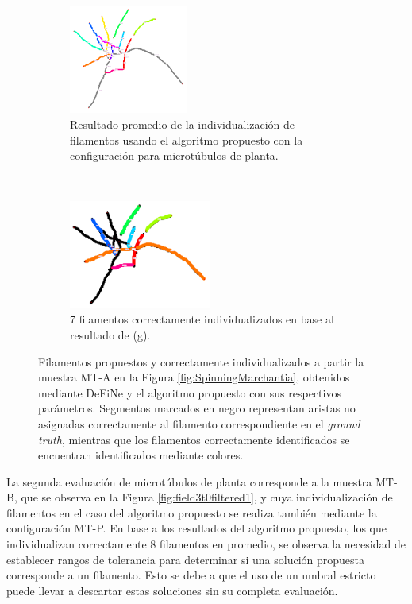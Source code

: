 \begin{figure}[h!]
    \begin{subfigure}[t]{0.49\textwidth}
        \centering
        \includegraphics[height=1.4in]{resultImages/50-ROIs-Spinning-Marchantia-phil-s10-v05-nobg-antLabeled.png}
        \caption{Resultado promedio de la individualizaci\'on de filamentos usando el algoritmo propuesto con la configuraci\'on para microt\'ubulos de planta.}
        \label{SpinningMarchantiaResults-worstPhil}
    \end{subfigure}
    ~
    \begin{subfigure}[t]{0.49\textwidth}
        \centering
        \includegraphics[height=1.4in]{resultImages/50-ROIs-Spinning-Marchantia-phil-s10-v05-exactMatch-antLabeled-thick.png}
        \caption{7 filamentos correctamente individualizados en base al resultado de (g).}
        \label{fig:SpinningMarchantiaResults-worstPhilExact}
    \end{subfigure}
    
    \caption[Filamentos propuestos y correctamente individualizados a partir la muestra MT-A en la Figura \ref{fig:SpinningMarchantia}.]{Filamentos propuestos y correctamente individualizados a partir la muestra MT-A en la Figura \ref{fig:SpinningMarchantia}, obtenidos mediante DeFiNe y el algoritmo propuesto con sus respectivos par\'ametros. Segmentos marcados en negro representan aristas no asignadas correctamente al filamento correspondiente en el {\it ground truth}, mientras que los filamentos correctamente identificados se encuentran identificados mediante colores.}
    \label{fig:SpinningMarchantiaResults}
\end{figure}

\clearpage
\newpage


La segunda evaluaci\'on de microt\'ubulos de planta corresponde a la muestra MT-B, que se observa en la Figura \ref{fig:field3t0filtered1}, y cuya individualizaci\'on de filamentos en el caso del algoritmo propuesto se realiza tambi\'en mediante la configuraci\'on MT-P. En base a los resultados del algoritmo propuesto, los que individualizan correctamente 8 filamentos en promedio, se observa la necesidad de establecer rangos de tolerancia para determinar si una soluci\'on propuesta corresponde a un filamento. Esto se debe a que el uso de un umbral estricto puede llevar a descartar estas soluciones sin su completa evaluaci\'on.

